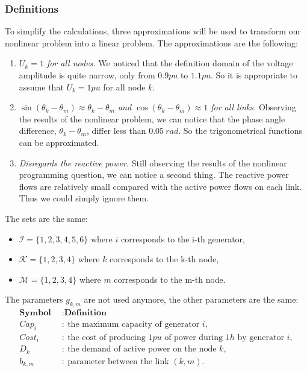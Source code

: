 \subsubsection*{Definitions}
To simplify the calculations, three approximations will be used to transform our nonlinear problem into a linear problem. The approximations are the following:
\begin{enumerate}
    \item \textit{$U_k = 1$ for all nodes.} We noticed that the definition domain of the voltage amplitude is quite narrow, only from $0.9 pu$ to $1.1 pu$. So it is appropriate to assume that $U_k = 1 pu$ for all node $k$.
    
    \item \textit{$\sin{(\theta_k - \theta_m)} \approx \theta_k - \theta_m$ and $\cos{(\theta_k - \theta_m)} \approx 1$ for all links.} Observing the results of the nonlinear problem, we can notice that the phase angle difference, $\theta_k - \theta_m$, differ less than $0.05 \ rad$. So the trigonometrical functions can be approximated.
    \item \textit{Disregards the reactive power.} Still observing the results of the nonlinear programming question, we can notice a second thing. The reactive power flows are relatively small compared with the active power flows on each link. Thus we could simply ignore them.
\end{enumerate}

\vspace{3mm}
\noindent 
The sets are the same:
\begin{itemize}
    \item $\mathcal{I} = \{1,2,3,4,5,6\}$ where $i$ corresponds to the i-th generator,
    \item $\mathcal{K}= \{1,2,3,4\}$ where $k$ corresponds to the k-th node,
    \item $\mathcal{M}= \{1,2,3,4\}$ where $m$ corresponds to the m-th node.
\end{itemize}

\vspace{3mm}
\noindent
The parameters $g_{k,m}$ are not used anymore, the other parameters are the same:
\begin{align*}
\textbf{Symbol} \enspace &: \textbf{Definition}\\
Cap_i &: \ \text{the maximum capacity of generator } i, \\
Cost_i &: \ \text{the cost of producing } 1 pu \text{ of power during } 1 h \text{ by generator } i, \\
D_k &: \ \text{the demand of active power on the node } k, \\
b_{k,m} &: \ \text{parameter between the link } (k,m).
\end{align*}

